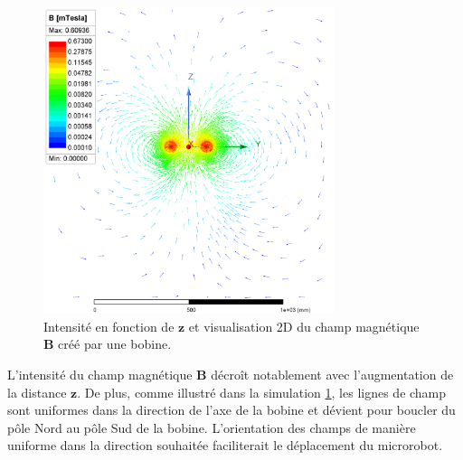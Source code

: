 \documentclass{article}
\begin{document}
    \begin{figure}[H] %
        \centering
        
        \begin{minipage}{0.55\textwidth}
        \hspace{0.5cm}
            \end{minipage}%
        \begin{minipage}{0.5\textwidth}
            \centering
            \includegraphics[width=8.5cm]{Images/Bobine simple4.png}
            \end{minipage}
            \caption{Intensité en fonction de $\mathbf{z}$ et visualisation 2D du champ magnétique $\mathbf{B}$ créé par une bobine.}
            \label{fig:champB_1Bobine}
        \end{figure}
\noindent
L'intensité du champ magnétique $\mathbf{B}$ décroît notablement avec l'augmentation de la distance $\mathbf{z}$. De plus, comme illustré dans la simulation \ref{fig:champB_1Bobine}, les lignes de champ sont uniformes dans la direction de l'axe de la bobine et dévient pour boucler du pôle Nord au pôle Sud de la bobine. L'orientation des champs de manière uniforme dans la direction souhaitée faciliterait le déplacement du microrobot.\\
\end{document}
